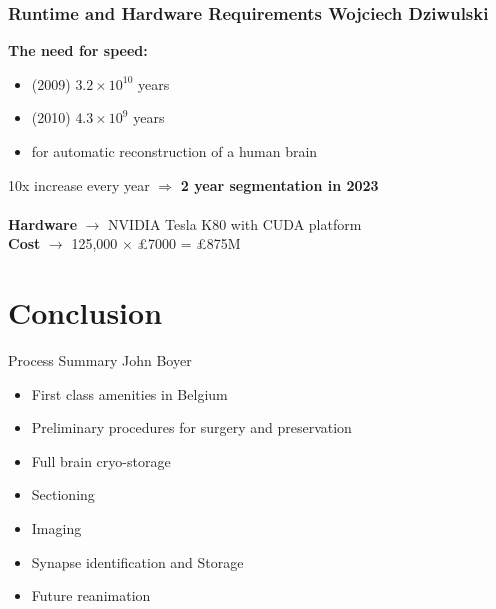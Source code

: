 \documentclass[10pt]{beamer}
\begin{document}
\begin{frame}[fragile]
  \frametitle{Runtime and Hardware Requirements  \hspace{0pt plus 1 filll} \small{Wojciech Dziwulski}}

  
	\textbf{The need for speed:}
   		\begin{itemize}
   			\item \alert{(2009)} $3.2 \times 10^{10}$ years
   			\cite{mishchenko2009automation}
   			\item \alert{(2010)} $4.3 \times 10^9$ years
   			\cite{chklovskii2010semi}
   			\item for automatic reconstruction of a human brain
   		\end{itemize}
	      		
   10x increase every year $\Rightarrow$ \textbf{2 year segmentation in 2023} \\
   
   $ $ \\
   
   \textbf{Hardware} $\rightarrow$ NVIDIA Tesla K80 with CUDA platform \\
   \textbf{Cost} $\rightarrow$ 125,000 $\times$ \pounds 7000 = \pounds 875M
  
\end{frame}



\section{Conclusion}

\begin{frame}{Process Summary\hspace{0pt plus 1 filll} \small{John Boyer}}
	
	\begin{itemize}[label={$\bullet$}]
		\item First class amenities in Belgium
		\item Preliminary procedures for surgery and preservation
		\item Full brain cryo-storage
		\item Sectioning
		\item Imaging
		\item Synapse identification and Storage
		\item Future reanimation
	\end{itemize}
	
\end{frame}
\end{document}
